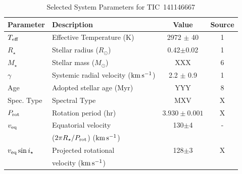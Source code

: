\documentclass{nature3}
\newcommand{\kms}{\ensuremath{\rm km\,s^{-1}}}
\begin{document}
\begin{table}
\scriptsize
\setlength{\tabcolsep}{2pt}
\centering
\caption{Selected System Parameters for TIC~141146667}
\label{tab:params}
\begin{tabular}{llcc}
\hline \hline
Parameter & Description & Value & Source\\
\hline 
%
$T_{\rm eff}$\dotfill                   & Effective Temperature (K) \hspace{9pt}\dotfill                 & 2972 $\pm$ 40    & 1 \\
%
%
$R_\star$\dotfill                       & Stellar radius ($R_\odot$)\dotfill                             & 0.42$\pm$0.02    & 1 \\
%
$M_\star$\dotfill                       & Stellar mass ($M_\odot$)\dotfill                               & XXX  & 6 \\
%
$\gamma$\dotfill                       & Systemic radial velocity (\kms)\dotfill                         & 2.2 $\pm$ 0.9  & 1  \\
%
Age                                     & Adopted stellar age (Myr)\dotfill                              & YYY  & 8 \\
%
Spec. Type\dotfill                      & Spectral Type\dotfill                                          & MXV              & X \\
%
$P_{\rm rot}$\dotfill                   & Rotation period (hr)\dotfill                                   & $3.930\pm 0.001$ & X \\
%
$v_{\rm eq}$\dotfill		                & Equatorial velocity \dotfill                                   &  130$\pm$4       & - \\
                                        & \hspace{3pt} ($2\pi R_\star/P_{\rm rot}$) (\kms)	             &                      \\
%
$v_{\rm eq}\sin{i_\star}$\dotfill		    & Projected rotational\dotfill                                   &  128$\pm$3       & X \\
                                        & \hspace{3pt} velocity (\kms)	                                 &                      \\

\end{tabular}
\end{table}
\end{document}
